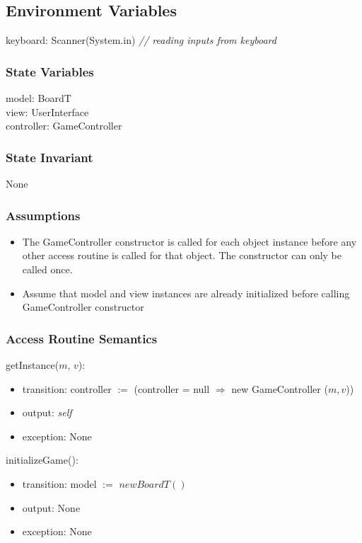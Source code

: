 \documentclass[12pt]{article}
\begin{document}
\subsection*{Environment Variables}

keyboard: Scanner(System.in) \qquad \textit{// reading inputs from keyboard}

\subsubsection* {State Variables}

model: BoardT \\
view: UserInterface \\
controller: GameController

\subsubsection* {State Invariant}

None

\subsubsection* {Assumptions}

\begin{itemize}
  \item The GameController constructor is called for each object instance before any
  other access routine is called for that object.  The constructor can only be
  called once.
  \item Assume that model and view instances are already initialized before calling GameController
        constructor
\end{itemize}

\subsubsection* {Access Routine Semantics}

getInstance($m$, $v$):
\begin{itemize}
  \item transition: controller $:=$ (controller = null $\Rightarrow$ new GameController ($m, v$))
  \item output: \textit{self}
  \item exception: None
\end{itemize}

\noindent initializeGame():
\begin{itemize}
  \item transition: model $:=$ $new BoardT()$
  \item output: None
  \item exception: None
\end{itemize}
\end{document}

